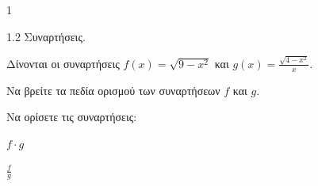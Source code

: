 \begin{ylh}{1}
    \item 1.2 Συναρτήσεις.
\end{ylh}
Δίνονται οι συναρτήσεις $f(x) = \sqrt{9-x^2}$ και $g(x) = \frac{\sqrt{4-x^2}}{x}$.
\begin{alist}
\item Να βρείτε τα πεδία ορισμού των συναρτήσεων $f$ και $g$. 
\item Να ορίσετε τις συναρτήσεις:
    \begin{rlist}
    \item $f \cdot g$ 
    \item $\frac{f}{g}$ 
    \end{rlist}
\end{alist}